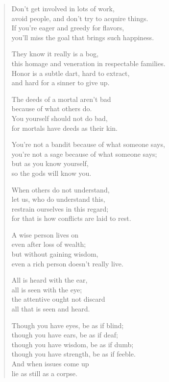 \documentclass[12pt,openany]{book}%
\begin{document}
\begin{verse}%
Don’t get involved in lots of work, \\
avoid people, and don’t try to acquire things. \\
If you’re eager and greedy for flavors, \\
you’ll miss the goal that brings such happiness. 

They know it really is a bog, \\
this homage and veneration in respectable families. \\
Honor is a subtle dart, hard to extract, \\
and hard for a sinner to give up. 

The deeds of a mortal aren’t bad \\
because of what others do. \\
You yourself should not do bad, \\
for mortals have deeds as their kin. 

You’re not a bandit because of what someone says, \\
you’re not a sage because of what someone says; \\
but as you know yourself, \\
so the gods will know you. 

When others do not understand, \\
let us, who do understand this, \\
restrain ourselves in this regard; \\
for that is how conflicts are laid to rest. 

A wise person lives on \\
even after loss of wealth; \\
but without gaining wisdom, \\
even a rich person doesn’t really live. 

All is heard with the ear, \\
all is seen with the eye; \\
the attentive ought not discard \\
all that is seen and heard. 

Though you have eyes, be as if blind; \\
though you have ears, be as if deaf; \\
though you have wisdom, be as if dumb; \\
though you have strength, be as if feeble. \\
And when issues come up \\
lie as still as a corpse. 

%
\end{verse}
\end{document}
